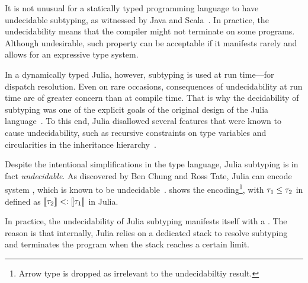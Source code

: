 It is not unusual for a statically typed programming language 
to have undecidable subtyping,
as witnessed by Java and Scala~\cite{grigore:java-undec:2017,hu:dot-undec:2020}.
In practice, the undecidability means that the
compiler might not terminate on some programs. Although undesirable,
such property can be acceptable if it manifests rarely and
allows for an expressive type system.

In a dynamically typed Julia, however, subtyping is used at run time---for
dispatch resolution. Even on rare occasions, consequences of
undecidability at run time are of greater concern than at compile time.
That is why the decidability of subtyping was one of the explicit goals
of the original design of the Julia language~\cite{bezanson:julia:2015}.
To this end, Julia disallowed several features that were known to cause
undecidability, such as recursive constraints on type variables and
circularities in the inheritance hierarchy~\cite{tate:taming-wildcards:2011}.

Despite the intentional simplifications in the type language,
Julia subtyping is in fact \emph{undecidable}.
As discovered by Ben Chung and Ross Tate, Julia can encode system
\FSubN, which is known to be undecidable~\cite{pierce:bound-sub-undec:1992}.
 shows the encoding\footnote{Arrow %
type is dropped as irrelevant to the undecidabiltiy result.},
with $\tau_1 \leq \tau_2$ in \FSubN defined as
$\llbracket \tau_2 \rrbracket <: \llbracket \tau_1 \rrbracket$ in Julia.

In practice, the undecidability of Julia subtyping manifests itself with
a .
The reason is that internally, Julia relies on a dedicated stack
to resolve subtyping
and terminates the program when the stack reaches a certain limit.
